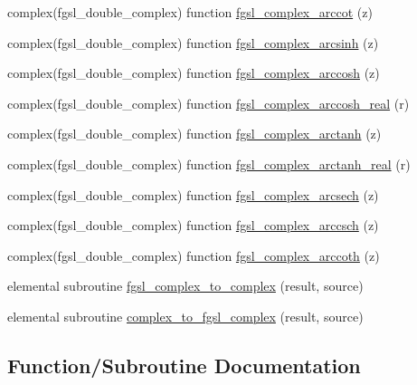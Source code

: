 \begin{DoxyCompactItemize}
\item 
complex(fgsl\+\_\+double\+\_\+complex) function \hyperlink{complex_8finc_a4349b9f5549b6c97a88f6d35001bac3f}{fgsl\+\_\+complex\+\_\+arccot} (z)
\item 
complex(fgsl\+\_\+double\+\_\+complex) function \hyperlink{complex_8finc_ab4a2a9438ed50ba0bfc611356fb209f9}{fgsl\+\_\+complex\+\_\+arcsinh} (z)
\item 
complex(fgsl\+\_\+double\+\_\+complex) function \hyperlink{complex_8finc_a4b6f8f498bd3315137bdd2fa3c1ca32a}{fgsl\+\_\+complex\+\_\+arccosh} (z)
\item 
complex(fgsl\+\_\+double\+\_\+complex) function \hyperlink{complex_8finc_ae32a1fa2c5421b1c5a1a24ef6aa3f033}{fgsl\+\_\+complex\+\_\+arccosh\+\_\+real} (r)
\item 
complex(fgsl\+\_\+double\+\_\+complex) function \hyperlink{complex_8finc_aedade37b8cb8ecb0263b539e086a7538}{fgsl\+\_\+complex\+\_\+arctanh} (z)
\item 
complex(fgsl\+\_\+double\+\_\+complex) function \hyperlink{complex_8finc_a833a0d9d5e06c7ce4e1a041a537b0607}{fgsl\+\_\+complex\+\_\+arctanh\+\_\+real} (r)
\item 
complex(fgsl\+\_\+double\+\_\+complex) function \hyperlink{complex_8finc_a2749a6da119458521c78fe5899617a51}{fgsl\+\_\+complex\+\_\+arcsech} (z)
\item 
complex(fgsl\+\_\+double\+\_\+complex) function \hyperlink{complex_8finc_a6c54ce2eb2c92bf23c14ca4bdf149b73}{fgsl\+\_\+complex\+\_\+arccsch} (z)
\item 
complex(fgsl\+\_\+double\+\_\+complex) function \hyperlink{complex_8finc_a424df2d30a3b02a8b853c8687957c554}{fgsl\+\_\+complex\+\_\+arccoth} (z)
\item 
elemental subroutine \hyperlink{complex_8finc_aa6202d24e55756a77e0f5883f3ea0c84}{fgsl\+\_\+complex\+\_\+to\+\_\+complex} (result, source)
\item 
elemental subroutine \hyperlink{complex_8finc_a2cbad87c3e0a645db0b486c0f1fddf5a}{complex\+\_\+to\+\_\+fgsl\+\_\+complex} (result, source)
\end{DoxyCompactItemize}


\subsection{Function/\+Subroutine Documentation}
\hypertarget{complex_8finc_a2cbad87c3e0a645db0b486c0f1fddf5a}{}
